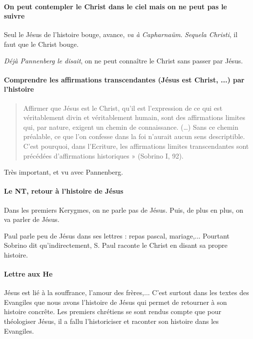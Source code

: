 \paragraph{On peut contempler le Christ dans le ciel mais on ne peut pas le suivre} Seul le Jésus de l'histoire bouge, avance, \textit{va à Capharnaüm}. \textit{Sequela Christi}, il faut que le Christ bouge. 

\textit{Déjà Pannenberg le disait}, on ne peut connaître le Christ sans passer par Jésus. 

\paragraph{Comprendre les affirmations transcendantes (Jésus est Christ, ...) par l'histoire}
\begin{quote}
    Affirmer que Jésus est le Christ, qu’il est l’expression de ce qui est véritablement divin et
véritablement humain, sont des affirmations limites qui, par nature, exigent un chemin de
connaissance. (…) Sans ce chemin préalable, ce que l’on confesse dans la foi n’aurait aucun sens
descriptible. C’est pourquoi, dans l’Ecriture, les affirmations limites transcendantes sont précédées
d’affirmations historiques » (Sobrino I, 92).
\end{quote}

Très important, et vu avec Pannenberg. 

\paragraph{Le NT, retour à l'histoire de Jésus} Dans les premiers Kerygmes, on ne parle pas de Jésus. Puis, de plus en plus, on va parler de Jésus. 
\begin{Ex}
    Paul parle peu de Jésus dans ses lettres : repas pascal, mariage,...
    Pourtant Sobrino dit qu'indirectement, S. Paul raconte le Christ en disant sa propre histoire. 
\end{Ex}

\paragraph{Lettre aux He} Jésus est lié à la souffrance, l'amour des frères,... C'est surtout dans les textes des Evangiles que nous avons l'histoire de Jésus qui permet de retourner à son histoire concrête. Les premiers chrétiens se sont rendus compte que pour théologiser Jésus, il a fallu l'historiciser et raconter son histoire dans les Evangiles. 

